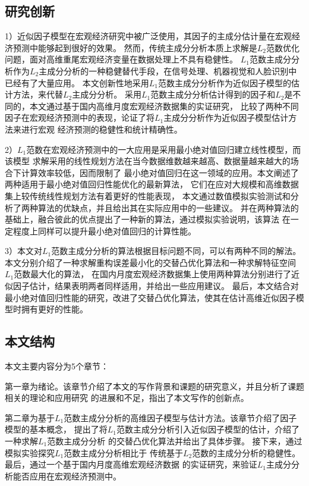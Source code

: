 \subsection{研究创新}

1）近似因子模型在宏观经济研究中被广泛使用，其因子的主成分估计量在宏观经济预测中能够起到很好的效果。
然而，传统主成分分析本质上求解是$L_2$范数优化问题，面对高维重尾宏观经济变量在数据处理上不具有稳健性。
$L_1$范数主成分分析作为$L_2$主成分分析的一种稳健替代手段，在信号处理、机器视觉和人脸识别中
已经有了大量应用。
本文创新性地采用$L_1$范数主成分分析作为近似因子模型的估计方法，来代替$L_2$主成分分析。
采用$L_1$范数主成分分析估计得到的因子和$L_2$是不同的，本文通过基于国内高维月度宏观经济数据集的实证研究，
比较了两种不同因子在宏观经济预测中的表现，论证了将$L_1$主成分分析作为近似因子模型估计方法来进行宏观
经济预测的稳健性和统计精确性。

2）$L_1$范数在宏观经济预测中的一大应用是采用最小绝对值回归建立线性模型，而该模型
求解采用的线性规划方法在当今数据维数越来越高、数据量越来越大的场合下计算效率较低，因而限制了
最小绝对值回归在这一领域的应用。本文阐述了两种适用于最小绝对值回归性能优化的最新算法，
它们在应对大规模和高维数据集上较传统线性规划方法有着更好的性能表现，
本文通过数值模拟实验测试和分析了两种算法的优缺点，并且给出其在实际应用中的一些建议。
并在两种算法的基础上，融合彼此的优点提出了一种新的算法，通过模拟实验说明，该算法
在一定程度上同样可以提升最小绝对值回归的计算性能。

3）本文对$L_1$范数主成分分析的算法根据目标问题不同，可以有两种不同的解法。
本文分别介绍了一种求解重构误差最小化的交替凸优化算法和一种求解特征空间$L_1$范数最大化的算法，
在国内月度宏观经济数据集上使用两种算法分别进行了近似因子估计，结果表明两者同样适用，并给出一些应用建议。
最后，本文结合对最小绝对值回归性能的研究，改进了交替凸优化算法，使其在估计高维近似因子模型时拥有更好的性能。

\subsection{本文结构}

本文主要内容分为5个章节：

第一章为绪论。该章节介绍了本文的写作背景和课题的研究意义，并且分析了课题相关的理论和应用研究
的进展和不足，指出了本文写作的创新点。

第二章为基于$L_1$范数主成分分析的高维因子模型与估计方法。该章节介绍了因子模型的基本概念，
提出了将$L_1$范数主成分分析引入近似因子模型的估计，介绍了一种求解$L_1$范数主成分分析
的交替凸优化算法并给出了具体步骤。
接下来，通过模拟实验探究$L_1$范数主成分分析相比于
传统基于$L_2$范数的主成分分析的稳健性。
最后，通过一个基于国内月度高维宏观经济数据
的实证研究，来验证$L_1$主成分分析能否应用在宏观经济预测中。

